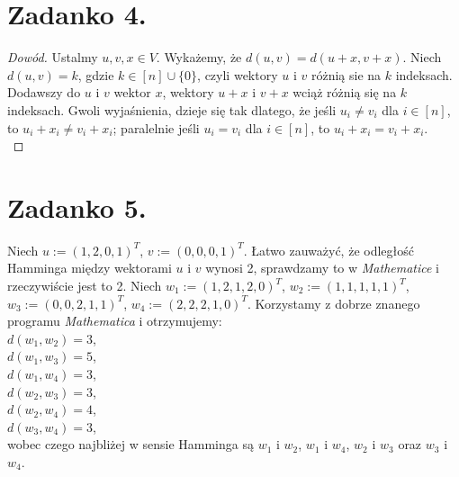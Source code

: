 \documentclass[10pt]{article} %
\begin{document}
\newpage
\section*{Zadanko 4.}
\begin{proof}[Dowód]
Ustalmy $u,v,x \in V$. Wykażemy, że $d(u,v) = d(u+x, v+x)$. Niech $d(u,v) = k$, gdzie $k \in [n] \cup \{0\}$, czyli wektory $u$ i $v$ różnią sie na $k$ indeksach. Dodawszy do $u$ i $v$ wektor $x$, wektory $u+x$ i $v+x$ wciąż różnią się na $k$ indeksach. Gwoli wyjaśnienia, dzieje się tak dlatego, że jeśli $u_i \neq v_i$ dla $i \in [n]$, to $u_i + x_i \neq v_i+x_i$; paralelnie jeśli $u_i = v_i$ dla $i \in [n]$, to $u_i + x_i = v_i+x_i$.\\
\end{proof}


\newpage
\section*{Zadanko 5.}
Niech $u := (1,2,0,1)^T$, $v := (0,0,0,1)^T$. Łatwo zauważyć, że odległość Hamminga między wektorami $u$ i $v$ wynosi 2, sprawdzamy to w \textit{Mathematice} i rzeczywiście jest to 2. Niech $w_1 := (1,2,1,2,0)^T$, $w_2 := (1,1,1,1,1)^T$, $w_3 := (0,0,2,1,1)^T$, $w_4 := (2,2,2,1,0)^T$. Korzystamy z dobrze znanego programu \textit{Mathematica} i otrzymujemy:\\
$d(w_1, w_2) = 3$,\\
$d(w_1, w_3) = 5$,\\
$d(w_1, w_4) = 3$,\\
$d(w_2, w_3) = 3$,\\
$d(w_2, w_4) = 4$,\\
$d(w_3, w_4) = 3$,\\
wobec czego najbliżej w sensie Hamminga są $w_1$ i $w_2$, $w_1$ i $w_4$, $w_2$ i $w_3$ oraz $w_3$ i $w_4$.



\newpage
\end{document}
